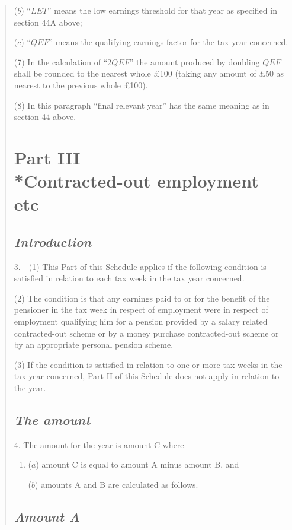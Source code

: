 \documentclass[12pt,a4paper]{article}
\begin{document}
\begin{quotation}
\begin{enumerate}
($b$) “$LET$” means the low earnings threshold for that year as specified in section 44A above;

($c$) “$QEF$” means the qualifying earnings factor for the tax year concerned.
\end{enumerate}

(7) In the calculation of “$2QEF$” the amount produced by doubling $QEF$ shall be rounded to the nearest whole £100 (taking any amount of £50 as nearest to the previous whole £100).

(8) In this paragraph “final relevant year” has the same meaning as in section 44 above.

\section*{Part III\\*Contracted-out employment etc}
\subsection*{\itshape Introduction}

3.---(1) This Part of this Schedule applies if the following condition is satisfied in relation to each tax week in the tax year concerned.

(2) The condition is that any earnings paid to or for the benefit of the pensioner in the tax week in respect of employment were in respect of employment qualifying him for a pension provided by a salary related contracted-out scheme or by a money purchase contracted-out scheme or by an appropriate personal pension scheme.

(3) If the condition is satisfied in relation to one or more tax weeks in the tax year 
concerned, Part II of this Schedule does not apply in relation to the year.

\subsection*{\itshape The amount}

4. The amount for the year is amount C where—
\begin{enumerate}\item[]
($a$) amount C is equal to amount A minus amount B, and

($b$) amounts A and B are calculated as follows.
\end{enumerate}

\subsection*{\itshape Amount A}


\end{quotation}
\end{document}
